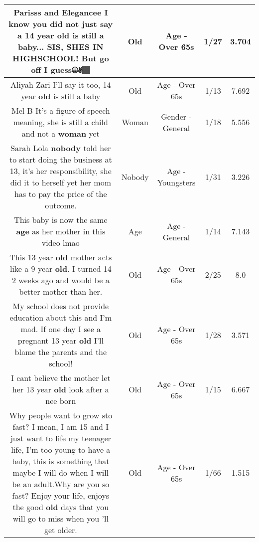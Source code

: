 \documentclass[11pt]{article}
\newlength\mylength
\begin{document}
\begin{center}
\begin{longtable}{|C{.65\mylength}|C{.30\mylength}|C{.12\mylength}|C{.12\mylength}|C{.12\mylength}|}
  \small Parisss and Elegancee I know you did not just say a 14 year \textbf{old} is still a baby... SIS, SHES IN HIGHSCHOOL! But go off I guess🤐✌🏽\normalsize   & Old & Age - Over 65s & 1/27 & 3.704 \\  \hline
  \small Aliyah Zari I'll say it too, 14 year \textbf{old} is still a baby\normalsize   & Old & Age - Over 65s & 1/13 & 7.692 \\  \hline
  \small Mel B It's a figure of speech meaning, she is still a child and not a \textbf{woman} yet\normalsize   & Woman & Gender - General & 1/18 & 5.556 \\  \hline
  \small Sarah Lola \textbf{nobody} told her to start doing the business at 13, it's her responsibility, she did it to herself yet her mom has to pay the price of the outcome.\normalsize   & Nobody & Age - Youngsters & 1/31 & 3.226 \\  \hline
  \small This baby is now the same \textbf{age} as her mother in this video lmao\normalsize   & Age & Age - General & 1/14 & 7.143 \\  \hline
  \small This 13 year \textbf{old} mother acts like a 9 year \textbf{old}. I turned 14 2 weeks ago and would be a better mother than her.\normalsize   & Old & Age - Over 65s & 2/25 & 8.0 \\  \hline
  \small My school does not provide education about this and I'm mad. If one day I see a pregnant 13 year \textbf{old} I'll blame the parents and the school!\normalsize   & Old & Age - Over 65s & 1/28 & 3.571 \\  \hline
  \small I cant believe the mother let her 13 year \textbf{old} look after a nee born\normalsize   & Old & Age - Over 65s & 1/15 & 6.667 \\  \hline
  \small Why people want to grow sto fast? I mean, I am 15 and I just want to life my teenager life, I'm too young to have a baby, this is something that maybe I will do when I will be an adult.Why are you so fast? Enjoy your life, enjoys the good \textbf{old} days that you will go to miss when you 'll get older.\normalsize   & Old & Age - Over 65s & 1/66 & 1.515 \\  \hline

\end{longtable}
\end{center}
\end{document}
